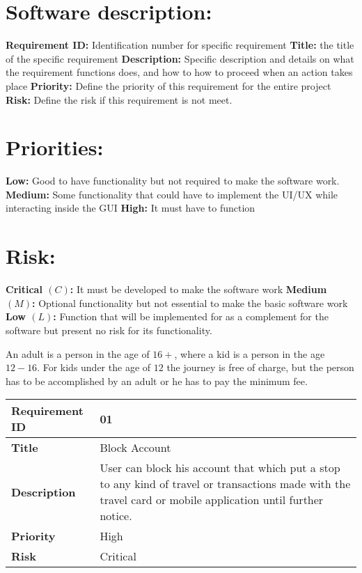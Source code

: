\section*{Software description:}
\textbf{Requirement ID:} Identification number for specific requirement
\textbf{Title:} the title of the specific requirement
\textbf{Description:} Specific description and details on what the requirement functions does, and how to how to proceed when an action takes place
\textbf{Priority:} Define the priority of this requirement for the entire project
\textbf{Risk:} Define the risk if this requirement is not meet.

\section*{Priorities:}
\textbf{Low:} Good to have functionality but not required to make the software work.
\textbf{Medium:} Some functionality that could have to implement the UI/UX while interacting inside the GUI
\textbf{High:} It must have to function

\section*{Risk:}
\textbf{Critical $(C)$:} It must be developed to make the software work
\textbf{Medium $(M)$:} Optional functionality but not essential to make the basic software work
\textbf{Low $(L)$:} Function that will be implemented for as a complement for the software but present no risk for its functionality. 

An adult is a person in the age of $16+$, where a kid is a person in the age $12 - 16$. For kids under the age of $12$ the journey is free of charge, but the person has to be accomplished by an adult or he has to pay the minimum fee.

\begin{center}
	\def\arraystretch{1.5}%
    \begin{tabular}{ | p{5cm} | p{5cm} |}
    \hline
    	\textbf{Requirement ID} & 01 \\ \hline
		\textbf{Title} & Block Account\\ \hline
		\textbf{Description} & User can block his account that which put a stop to any kind of travel or transactions made with the travel card or mobile application until further notice.\\ \hline
		\textbf{Priority} & High\\ \hline
		\textbf{Risk} & Critical\\
      \hline
    \end{tabular}
\end{center}

